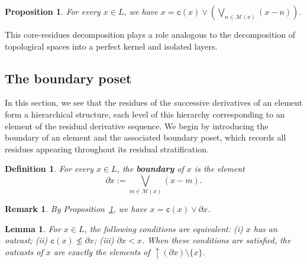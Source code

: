 \documentclass{article}
\newcommand{\comm}[2]{\begin{tcolorbox}[colback=gray!40]\textbf{Comment} (#1) : #2\end{tcolorbox}}
\newcommand{\blue}{\color{blue}}
\newtheorem{lemma}[theorem]{Lemma}
\newtheorem{definition}[theorem]{Definition}
\newtheorem{notation}[theorem]{Notation}
\newtheorem{proposition}[theorem]{Proposition}
\newtheorem{remark}[theorem]{Remark}
\begin{document}

\begin{proposition}\label{lemma.core.complements}
    For every $x \in L$, we have $x = \texttt{c}(x) \vee \left( \underset{n \in \mathcal{M}(x)}{\bigvee} (x-n)\right)$.
\end{proposition}

This core-residues decomposition plays a role analogous to the decomposition of topological spaces into a perfect kernel and isolated layers.

\subsection{\label{section.def.boundary.poset}The boundary poset}

{In this section, we see that the residues of the successive derivatives of an element form a hierarchical structure, each level of this hierarchy corresponding to an element of the residual derivative sequence. We begin by introducing the boundary of an element and the associated boundary poset, which records all residues appearing throughout its residual stratification.
\begin{definition}
For every \(x\in L\), the \textbf{boundary} of \(x\) is the element 
\[\partial x:=\bigvee_{m\in\mathcal{M}(x)}(x-m).\]
\end{definition}

\begin{remark}By Proposition~\ref{lemma.core.complements}, we have \(x=\texttt{c}(x)\vee\partial x\).\end{remark}}

\begin{lemma}\label{lemma.char.outcasts}
    For $x \in L$, the following conditions are equivalent: (i) $x$ has an outcast; (ii) $\texttt{c}(x) \not \le \partial x$; (iii) $\partial x < x$. When these conditions are satisfied, the outcasts of $x$ are exactly the elements of $\mathop{\uparrow} (\partial x) \setminus \{x\}$.
\end{lemma}
\end{document}
